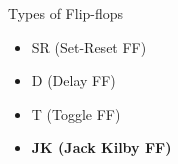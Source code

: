 \begin{frame}{Types of Flip-flops}
    \begin{itemize}
        \item SR (Set-Reset FF)
        \item D (Delay FF)
        \item T (Toggle FF)
        \pause
        \item \textbf{JK (Jack Kilby FF)}
    \end{itemize}
\end{frame}